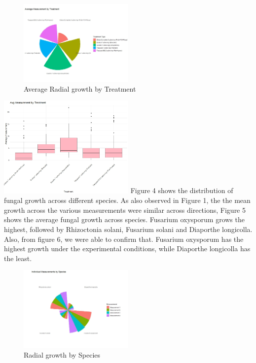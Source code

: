 \documentclass[
  10pt,
  letterpaper,
  twocolumn]{article}
\begin{document}
\begin{figure}

{\centering \includegraphics[width=0.5\textwidth,height=\textheight]{Fig3.jpeg}

}

\caption{Average Radial growth by Treatment}

\end{figure}

\includegraphics[width=0.5\textwidth,height=\textheight]{Fig5.jpeg}
Figure 4 shows the distribution of fungal growth across different
species. As also observed in Figure 1, the the mean growth across the
various measurements were similar across directions, Figure 5 shows the
average fungal growth across species. Fusarium oxysporum grows the
highest, followed by Rhizoctonia solani, Fusarium solani and Diaporthe
longicolla. Also, from figure 6, we were able to confirm that. Fusarium
oxysporum has the highest growth under the experimental conditions,
while Diaporthe longicolla has the least.

\begin{figure}

{\centering \includegraphics[width=0.5\textwidth,height=\textheight]{Fig2.jpeg}

}

\caption{Radial growth by Species}

\end{figure}
\end{document}
